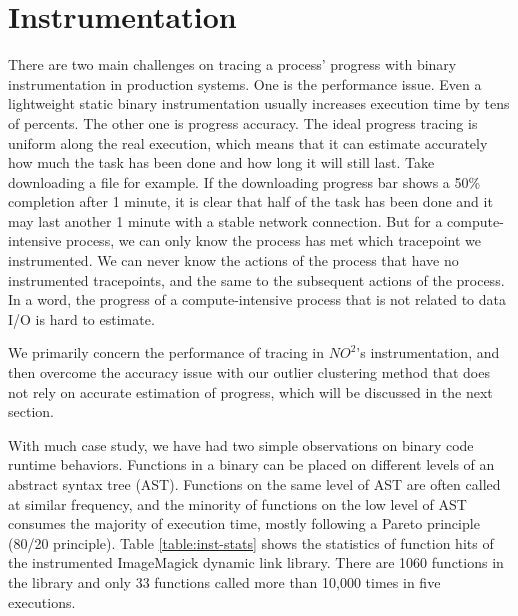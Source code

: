 \section{Instrumentation}

There are two main challenges on tracing a process' progress with binary instrumentation
in production systems. One is the performance issue. Even a lightweight static binary
instrumentation usually increases execution time by tens of percents. The other one is
progress accuracy. The ideal progress tracing is uniform along the real execution, which
means that it can estimate accurately how much the task has been done and how long it will
still last. Take downloading a file for example. If the downloading progress bar shows a
50\% completion after 1 minute, it is clear that half of the task has been done and it may
last another 1 minute with a stable network connection. But for a compute-intensive
process, we can only know the process has met which tracepoint we instrumented. We can
never know the actions of the process that have no instrumented tracepoints, and the same
to the subsequent actions of the process. In a word, the progress of a compute-intensive
process that is not related to data I/O is hard to estimate.

We primarily concern the performance of tracing in $NO^2$'s instrumentation, and then
overcome the accuracy issue with our outlier clustering method that does not rely on
accurate estimation of progress, which will be discussed in the next section.

With much case study, we have had two simple observations on binary code runtime
behaviors. Functions in a binary can be placed on different levels of an abstract syntax
tree (AST). Functions on the same level of AST are often called at similar frequency, and
the minority of functions on the low level of AST consumes the majority of execution time,
mostly following a Pareto principle (80/20 principle). Table \ref{table:inst-stats} shows
the statistics of function hits of the instrumented ImageMagick dynamic link library.
There are 1060 functions in the library and only 33 functions called more than 10,000
times in five executions.

